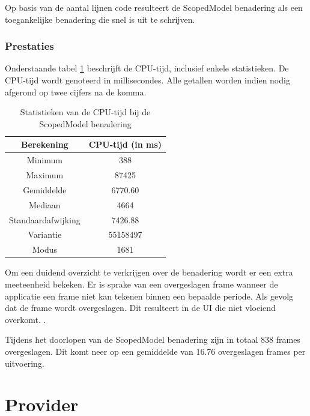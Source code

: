 Op basis van de aantal lijnen code resulteert de ScopedModel benadering als een toegankelijke benadering die snel is uit te schrijven.

\subsubsection{Prestaties}
Onderstaande tabel \ref{table:experiment-scopedmodel-statistics} beschrijft de CPU-tijd, inclusief enkele statistieken. De CPU-tijd wordt genoteerd in millisecondes. Alle getallen worden indien nodig afgerond op twee cijfers na de komma.
\begin{table}[H]
    \centering
    \begin{tabular}{c|c}
        \textbf{Berekening} & \textbf{CPU-tijd (in ms)} \\ \hline
        Minimum             & 388                       \\ \hline
        Maximum             & 87425                     \\ \hline
        Gemiddelde          & 6770.60                   \\ \hline
        Mediaan             & 4664                      \\ \hline
        Standaardafwijking  & 7426.88                   \\ \hline
        Variantie           & 55158497                  \\ \hline
        Modus               & 1681                      \\                
    \end{tabular}
    \caption{Statistieken van de CPU-tijd bij de ScopedModel benadering}
    \label{table:experiment-scopedmodel-statistics}
\end{table}

Om een duidend overzicht te verkrijgen over de benadering wordt er een extra meeteenheid bekeken. Er is sprake van een overgeslagen frame wanneer de applicatie een frame niet kan tekenen binnen een bepaalde periode. Als gevolg dat de frame wordt overgeslagen. Dit resulteert in de UI die niet vloeiend overkomt. \autocite{Flutter2019d}.

Tijdens het doorlopen van de ScopedModel benadering zijn in totaal 838 frames overgeslagen. Dit komt neer op een gemiddelde van 16.76 overgeslagen frames per uitvoering.

\section{Provider}
